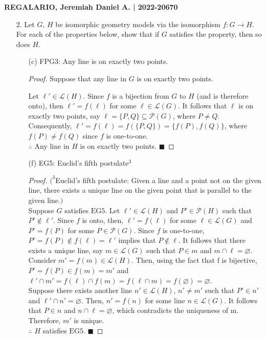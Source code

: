 \documentclass[a4paper, 10pt]{exam}
\begin{document}
\textbf{REGALARIO, Jeremiah Daniel A. | 2022-20670}
\begin{enumerate}
    
    \item[2.] Let $G$, $H$ be isomorphic geometry models via the isomorphism $f: G \to H$. For each of the properties below, show that if $G$ satisfies the property, then so does $H$.
    \begin{enumerate}
        
        \item[(c)] FPG3: Any line is on exactly two points.
        \begin{proof}
            Suppose that any line in $G$ is on exactly two points.

            Let $\ell' \in \mathscr{L}(H)$. Since $f$ is a bijection from $G$ to $H$ (and is therefore onto), then $\ell' = f(\ell)$ for some $\ell \in \mathscr{L}(G)$. It follows that $\ell$ is on exactly two points, say $\ell = \{P, Q\} \subseteq \mathscr{P}(G)$, where $P \neq Q$. Consequently, $\ell' = f(\ell) = f(\{P, Q\}) = \{f(P), f(Q)\}$, where $f(P) \neq f(Q)$ since $f$ is one-to-one. \\
    
            $\therefore$ Any line in $H$ is on exactly two points. $\blacksquare$
        \end{proof}
        
        \item[(f)] EG5: Euclid’s fifth postulate$^3$
        \begin{proof}
        $(^3$Euclid’s fifth postulate: Given a line and a point not on the given line, there exists a unique line
on the given point that is parallel to the given line.$)$ \\

       Suppose $G$ satisfies $\text{EG5}$. Let $\ell' \in \mathscr{L}(H)$ and $P' \in \mathscr{P}(H)$ such that $P' \not\in \ell'$. Since $f$ is onto, then, $\ell' = f(\ell)$ for some $\ell \in \mathscr{L}(G)$ and $P' = f(P)$ for some $P \in \mathscr{P}(G)$. Since $f$ is one-to-one, $P' = f(P) \not\in f(\ell) = \ell'$ implies that $P \not\in \ell$. It follows that there exists a unique line, say $m \in \mathscr{L}(G)$ such that $P \in m$ and $m \cap \ell = \varnothing.$ Consider $m' = f(m) \in \mathscr{L}(H)$. Then, using the fact that f is bijective, $P' = f(P) \in f(m) = m'$ and $\ell' \cap m' = f(\ell) \cap f(m) = f(\ell \cap m) = f(\varnothing) = \varnothing$. \\

       Suppose there exists another line $n' \in \mathscr{L}(H)$,  $n' \neq m'$ such that $P' \in n'$ and $\ell' \cap n' = \varnothing$. Then, $n' = f(n)$ for some line $n \in \mathscr{L}(G)$. It follows that $P \in n$ and $n \cap \ell = \varnothing$, which contradicts the uniqueness of m. Therefore, $m'$ is unique. \\

       $\therefore$ $H$ satisfies $\text{EG5}$. $\blacksquare$
        \end{proof}
    \end{enumerate}
    
    
\end{enumerate}
\end{document}
